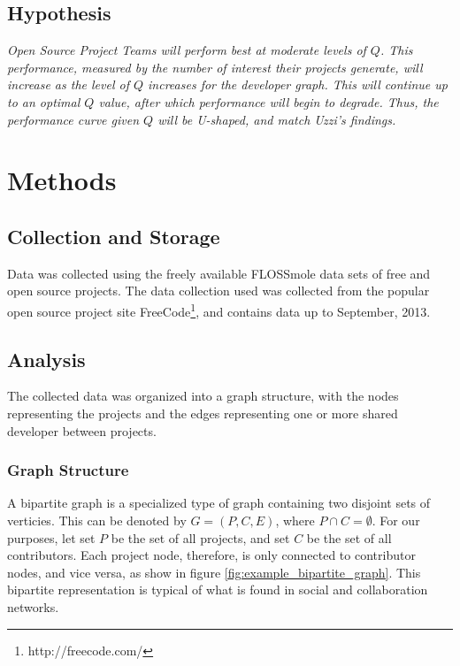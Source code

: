 \documentclass{proc}
\begin{document}
\subsection{Hypothesis}

\textit{Open Source Project Teams will perform best at moderate levels of $Q$. This performance, measured by the number of interest their projects generate, will increase as the level of $Q$ increases for the developer graph. This will continue up to an optimal $Q$ value, after which performance will begin to degrade. Thus, the performance curve given $Q$ will be U-shaped, and match Uzzi's findings\cite{uzzi2005collaboration}. }

\section{Methods}

\subsection{Collection and Storage}
Data was collected using the freely available FLOSSmole\cite{floss2006} data sets of free and open source projects. The data collection used was collected from the popular open source project site FreeCode\footnote{http://freecode.com/}, and contains data up to September, 2013.

\subsection{Analysis}
The collected data was organized into a graph structure, with the nodes representing the projects and the edges representing one or more shared developer between projects.


\subsubsection{Graph Structure}
A bipartite graph is a specialized type of graph containing two disjoint sets of verticies. This can be denoted by ${G=(P,C,E)}$, where ${P \cap C = \emptyset}$. For our purposes, let set $P$ be the set of all projects, and set $C$ be the set of all contributors. Each project node, therefore, is only connected to contributor nodes, and vice versa, as show in figure \ref{fig:example_bipartite_graph}. This bipartite representation is typical of what is found in social and collaboration networks\cite{ramasco2004self}.
\end{document}
